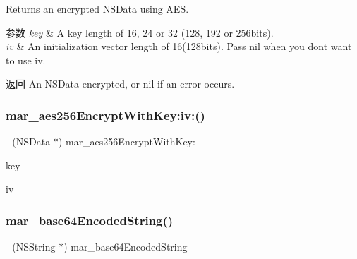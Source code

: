 Returns an encrypted N\+S\+Data using A\+ES.


\begin{DoxyParams}{参数}
{\em key} & A key length of 16, 24 or 32 (128, 192 or 256bits).\\
\hline
{\em iv} & An initialization vector length of 16(128bits). Pass nil when you don\textquotesingle{}t want to use iv.\\
\hline
\end{DoxyParams}
\begin{DoxyReturn}{返回}
An N\+S\+Data encrypted, or nil if an error occurs. 
\end{DoxyReturn}
\mbox{\label{category_n_s_data_07_m_a_r_e_x_08_a35eb2bf9db66880cf4f2200d4b3605bc}} 
\subsubsection{\texorpdfstring{mar\+\_\+aes256\+Encrypt\+With\+Key\+:iv\+:()}{mar\_aes256EncryptWithKey:iv:()}\hspace{0.1cm}{\footnotesize\ttfamily [2/2]}}
{\footnotesize\ttfamily -\/ (N\+S\+Data $\ast$) mar\+\_\+aes256\+Encrypt\+With\+Key\+: \begin{DoxyParamCaption}\item[{(N\+S\+Data $\ast$)}]{key }\item[{iv:(N\+S\+Data $\ast$)}]{iv }\end{DoxyParamCaption}\hspace{0.3cm}{\ttfamily [implementation]}}

\mbox{\label{category_n_s_data_07_m_a_r_e_x_08_a800302925de72a0c2d29fb68b361965d}} 
\subsubsection{\texorpdfstring{mar\+\_\+base64\+Encoded\+String()}{mar\_base64EncodedString()}}
{\footnotesize\ttfamily -\/ (N\+S\+String $\ast$) mar\+\_\+base64\+Encoded\+String \begin{DoxyParamCaption}{ }\end{DoxyParamCaption}}

